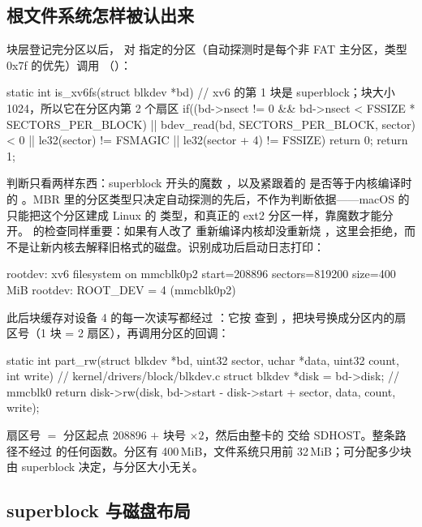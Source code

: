 \subsection{根文件系统怎样被认出来}

块层登记完分区以后， 对  指定的分区（自动探测时是每个非 FAT 主分区，类型 0x7f 的优先）调用 （）：

\begin{ccode}
static int is_xv6fs(struct blkdev *bd) {
  // xv6 的第 1 块是 superblock；块大小 1024，所以它在分区内第 2 个扇区
  if((bd->nsect != 0 && bd->nsect < FSSIZE * SECTORS_PER_BLOCK) ||
     bdev_read(bd, SECTORS_PER_BLOCK, sector) < 0 ||
     le32(sector) != FSMAGIC || le32(sector + 4) != FSSIZE)
    return 0;
  return 1;
}
\end{ccode}

判断只看两样东西：superblock 开头的魔数 ，以及紧跟着的  是否等于内核编译时的 。MBR 里的分区类型只决定自动探测的先后，不作为判断依据——macOS 的  只能把这个分区建成 Linux 的  类型，和真正的 ext2 分区一样，靠魔数才能分开。 的检查同样重要：如果有人改了  重新编译内核却没重新烧 ，这里会拒绝，而不是让新内核去解释旧格式的磁盘。识别成功后启动日志打印：

\begin{txtcode}
rootdev: xv6 filesystem on mmcblk0p2 start=208896 sectors=819200 size=400 MiB
rootdev: ROOT_DEV = 4 (mmcblk0p2)
\end{txtcode}

此后块缓存对设备 4 的每一次读写都经过 ：它按  查到 ，把块号换成分区内的扇区号（1 块 = 2 扇区），再调用分区的回调：

\begin{ccode}
static int part_rw(struct blkdev *bd, uint32 sector, uchar *data,
                   uint32 count, int write) {   // kernel/drivers/block/blkdev.c
  struct blkdev *disk = bd->disk;               // mmcblk0
  return disk->rw(disk, bd->start - disk->start + sector, data, count, write);
}
\end{ccode}

扇区号 $=$ 分区起点 208896 $+$ 块号 $\times 2$，然后由整卡的  交给 SDHOST。整条路径不经过  的任何函数。分区有 400\,MiB，文件系统只用前 32\,MiB；可分配多少块由 superblock 决定，与分区大小无关。

\subsection{superblock 与磁盘布局}

